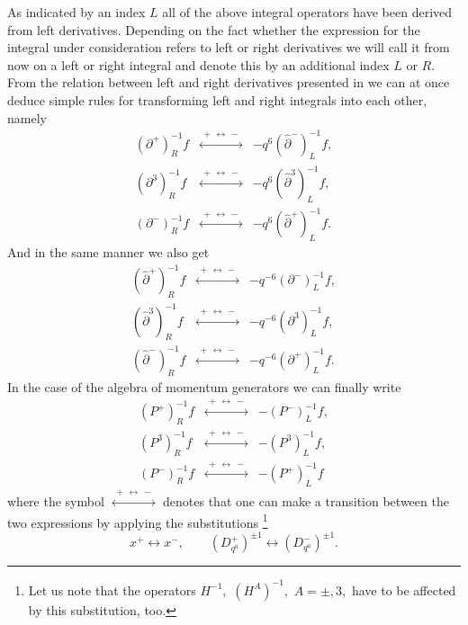 \documentclass[a4paper,11pt,oneside]{article}
\newcommand{\underleftrightarrow}{\stackrel{\;+\,\longleftrightarrow\,-\;}{\longleftrightarrow}}
\begin{document}
As indicated by an index $L$ all of the above integral operators have been
derived from left derivatives. Depending on the fact whether the expression
for the integral under consideration refers to left or right derivatives we
will call it from now on a left or right integral and denote this by an
additional index $L$ or $R$. From the relation between left and right
derivatives presented in \cite{BW01} we can at once deduce simple rules for
transforming left and right integrals into each other, namely 
\begin{eqnarray}
\left( \partial ^{+}\right) _{R}^{-1}f&\underleftrightarrow&-q^{6}\left( \hat{\partial}^{-}\right)
_{L}^{-1}f, \\
\left( \partial ^{3}\right) _{R}^{-1}f&\underleftrightarrow&-q^{6}\left( \hat{\partial}^{3}\right)
_{L}^{-1}f,  \nonumber \\
\left( \partial ^{-}\right) _{R}^{-1}f&\underleftrightarrow&-q^{6}\left( \hat{\partial}^{+}\right)
_{L}^{-1}f.  \nonumber
\end{eqnarray}
And in the same manner we also get 
\begin{eqnarray}
\left( \hat{\partial}^{+}\right) _{R}^{-1}f&\underleftrightarrow&-q^{-6}\left( \partial ^{-}\right)
_{L}^{-1}f, \\
\left( \hat{\partial}^{3}\right) _{R}^{-1}f&\underleftrightarrow&-q^{-6}\left( \partial ^{3}\right)
_{L}^{-1}f,  \nonumber \\
\left( \hat{\partial}^{-}\right) _{R}^{-1}f&\underleftrightarrow&-q^{-6}\left( \partial ^{+}\right)
_{L}^{-1}f.  \nonumber
\end{eqnarray}
In the case of the algebra of momentum generators we can finally write 
\begin{eqnarray}
\left( P^{+}\right) _{R}^{-1}f&\underleftrightarrow&-\left( P^{-}\right) _{L}^{-1}f, \\
\left( P^{3}\right) _{R}^{-1}f&\underleftrightarrow&-\left( P^{3}\right) _{L}^{-1}f,  \nonumber \\
\left( P^{-}\right) _{R}^{-1}f&\underleftrightarrow&-\left( P^{+}\right) _{L}^{-1}f \nonumber
\end{eqnarray}
where the symbol $\underleftrightarrow$
denotes that one can make a transition between the two expressions by
applying the substitutions \footnote{%
Let us note that the operators $H^{-1},$ $\left( H^{A}\right) ^{-1},$ $A=\pm
,3,$ have to be affected by this substitution, too.} 
\begin{equation}
x^{+}\longleftrightarrow x^{-},\qquad \left( D_{q^{a}}^{+}\right) ^{\pm
1}\longleftrightarrow \left( D_{q^{a}}^{-}\right) ^{\pm 1}.
\end{equation}
\end{document}
